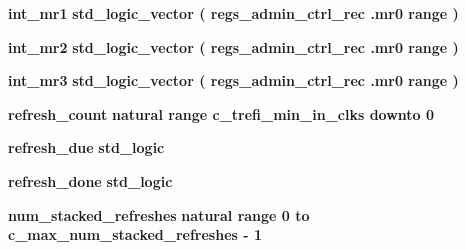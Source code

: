 \begin{DoxyCompactItemize}
\item 
{\bf int\+\_\+mr1} {\bfseries \textcolor{comment}{std\+\_\+logic\+\_\+vector}\textcolor{vhdlchar}{ }\textcolor{vhdlchar}{(}\textcolor{vhdlchar}{ }{\bfseries {\bf regs\+\_\+admin\+\_\+ctrl\+\_\+rec}} \textcolor{vhdlchar}{.}{\bfseries {\bf mr0}} \textcolor{vhdlchar}{ }\textcolor{vhdlchar}{\textquotesingle{}}\textcolor{vhdlchar}{ }\textcolor{keywordflow}{range}\textcolor{vhdlchar}{ }\textcolor{vhdlchar}{ }\textcolor{vhdlchar}{)}\textcolor{vhdlchar}{ }} 
\item 
{\bf int\+\_\+mr2} {\bfseries \textcolor{comment}{std\+\_\+logic\+\_\+vector}\textcolor{vhdlchar}{ }\textcolor{vhdlchar}{(}\textcolor{vhdlchar}{ }{\bfseries {\bf regs\+\_\+admin\+\_\+ctrl\+\_\+rec}} \textcolor{vhdlchar}{.}{\bfseries {\bf mr0}} \textcolor{vhdlchar}{ }\textcolor{vhdlchar}{\textquotesingle{}}\textcolor{vhdlchar}{ }\textcolor{keywordflow}{range}\textcolor{vhdlchar}{ }\textcolor{vhdlchar}{ }\textcolor{vhdlchar}{)}\textcolor{vhdlchar}{ }} 
\item 
{\bf int\+\_\+mr3} {\bfseries \textcolor{comment}{std\+\_\+logic\+\_\+vector}\textcolor{vhdlchar}{ }\textcolor{vhdlchar}{(}\textcolor{vhdlchar}{ }{\bfseries {\bf regs\+\_\+admin\+\_\+ctrl\+\_\+rec}} \textcolor{vhdlchar}{.}{\bfseries {\bf mr0}} \textcolor{vhdlchar}{ }\textcolor{vhdlchar}{\textquotesingle{}}\textcolor{vhdlchar}{ }\textcolor{keywordflow}{range}\textcolor{vhdlchar}{ }\textcolor{vhdlchar}{ }\textcolor{vhdlchar}{)}\textcolor{vhdlchar}{ }} 
\item 
{\bf refresh\+\_\+count} {\bfseries \textcolor{comment}{natural}\textcolor{vhdlchar}{ }\textcolor{vhdlchar}{ }\textcolor{vhdlchar}{ }\textcolor{keywordflow}{range}\textcolor{vhdlchar}{ }\textcolor{vhdlchar}{ }\textcolor{vhdlchar}{ }\textcolor{vhdlchar}{ }{\bfseries {\bf c\+\_\+trefi\+\_\+min\+\_\+in\+\_\+clks}} \textcolor{vhdlchar}{ }\textcolor{keywordflow}{downto}\textcolor{vhdlchar}{ }\textcolor{vhdlchar}{ } \textcolor{vhdldigit}{0} \textcolor{vhdlchar}{ }} 
\item 
{\bf refresh\+\_\+due} {\bfseries \textcolor{comment}{std\+\_\+logic}\textcolor{vhdlchar}{ }} 
\item 
{\bf refresh\+\_\+done} {\bfseries \textcolor{comment}{std\+\_\+logic}\textcolor{vhdlchar}{ }} 
\item 
{\bf num\+\_\+stacked\+\_\+refreshes} {\bfseries \textcolor{comment}{natural}\textcolor{vhdlchar}{ }\textcolor{vhdlchar}{ }\textcolor{vhdlchar}{ }\textcolor{keywordflow}{range}\textcolor{vhdlchar}{ }\textcolor{vhdlchar}{ } \textcolor{vhdldigit}{0} \textcolor{vhdlchar}{ }\textcolor{keywordflow}{to}\textcolor{vhdlchar}{ }\textcolor{vhdlchar}{ }\textcolor{vhdlchar}{ }\textcolor{vhdlchar}{ }{\bfseries {\bf c\+\_\+max\+\_\+num\+\_\+stacked\+\_\+refreshes}} \textcolor{vhdlchar}{-\/}\textcolor{vhdlchar}{ } \textcolor{vhdldigit}{1} \textcolor{vhdlchar}{ }} 

\end{DoxyCompactItemize}
